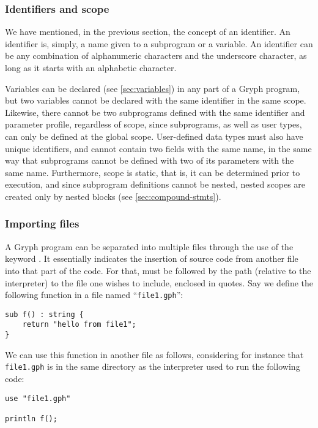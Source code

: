 \subsubsection{Identifiers and scope}
\label{sec:idsandscope}
We have mentioned, in the previous section, the concept of an identifier. An identifier is, simply, a name given to a subprogram or a variable. An identifier can be any combination of alphanumeric characters and the underscore character, as long as it starts with an alphabetic character.

Variables can be declared (see \autoref{sec:variables}) in any part of a Gryph program, but two variables cannot be declared with the same identifier in the same scope. Likewise, there cannot be two subprograms defined with the same identifier and parameter profile, regardless of scope, since subprograms, as well as user types, can only be defined at the global scope. User-defined data types must also have unique identifiers, and cannot contain two fields with the same name, in the same way that subprograms cannot be defined with two of its parameters with the same name.
Furthermore, scope is static, that is, it can be determined prior to execution, and since subprogram definitions cannot be nested, nested scopes are created only by nested blocks (see \autoref{sec:compound-stmts}).

\subsubsection{Importing files}
A Gryph program can be separated into multiple files through the use of the keyword . It essentially indicates the insertion of source code from another file into that part of the code. For that,  must be followed by the path (relative to the interpreter) to the file one wishes to include, enclosed in quotes. Say we define the following function in a file named ``\texttt{file1.gph}'':
\begin{lstlisting}[language=Gryph]
sub f() : string {
	return "hello from file1";
}
\end{lstlisting}
We can use this function in another file as follows, considering for instance that \texttt{file1.gph} is in the same directory as the interpreter used to run the following code:
\begin{lstlisting}[language=Gryph]
use "file1.gph"

println f();
\end{lstlisting}